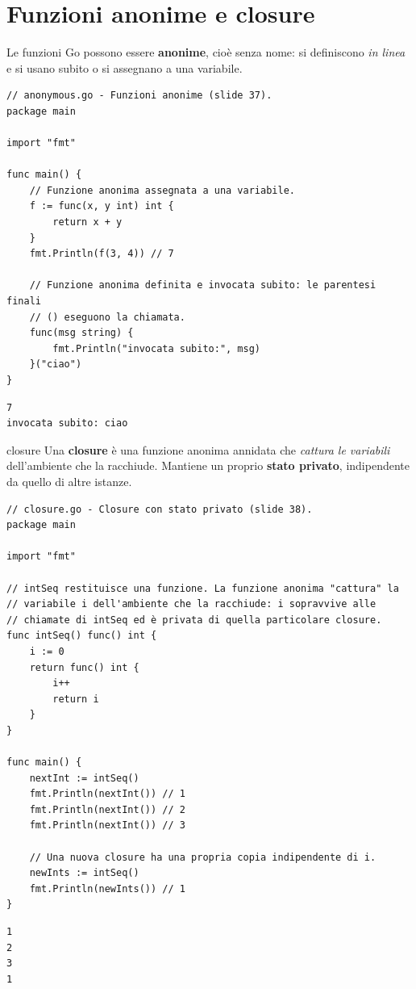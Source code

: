 \documentclass[11pt,a4paper]{report}
\begin{document}
\section{Funzioni anonime e closure}

Le funzioni Go possono essere \textbf{anonime}, cioè senza nome: si definiscono
\emph{in linea} e si usano subito o si assegnano a una variabile.

\begin{lstlisting}[style=gocode,caption={\texttt{02\_functions/anonymous.go}}]
// anonymous.go - Funzioni anonime (slide 37).
package main

import "fmt"

func main() {
	// Funzione anonima assegnata a una variabile.
	f := func(x, y int) int {
		return x + y
	}
	fmt.Println(f(3, 4)) // 7

	// Funzione anonima definita e invocata subito: le parentesi finali
	// () eseguono la chiamata.
	func(msg string) {
		fmt.Println("invocata subito:", msg)
	}("ciao")
}
\end{lstlisting}
\begin{lstlisting}[style=output]
7
invocata subito: ciao
\end{lstlisting}

\begin{definizione}{closure}
Una \textbf{closure} è una funzione anonima annidata che \emph{cattura le
variabili} dell'ambiente che la racchiude. Mantiene un proprio \textbf{stato
privato}, indipendente da quello di altre istanze.
\end{definizione}

\begin{lstlisting}[style=gocode,caption={\texttt{02\_functions/closure.go}}]
// closure.go - Closure con stato privato (slide 38).
package main

import "fmt"

// intSeq restituisce una funzione. La funzione anonima "cattura" la
// variabile i dell'ambiente che la racchiude: i sopravvive alle
// chiamate di intSeq ed è privata di quella particolare closure.
func intSeq() func() int {
	i := 0
	return func() int {
		i++
		return i
	}
}

func main() {
	nextInt := intSeq()
	fmt.Println(nextInt()) // 1
	fmt.Println(nextInt()) // 2
	fmt.Println(nextInt()) // 3

	// Una nuova closure ha una propria copia indipendente di i.
	newInts := intSeq()
	fmt.Println(newInts()) // 1
}
\end{lstlisting}
\begin{lstlisting}[style=output]
1
2
3
1
\end{lstlisting}
\end{document}
